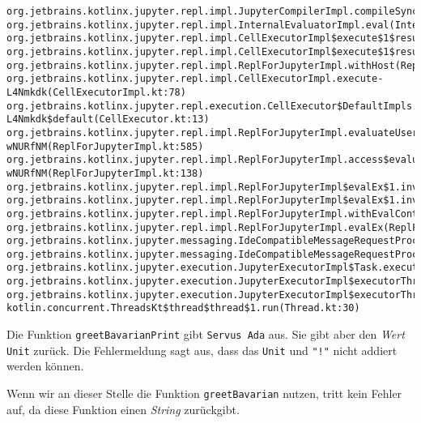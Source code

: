 \begin{verbatim}
org.jetbrains.kotlinx.jupyter.repl.impl.JupyterCompilerImpl.compileSync(JupyterCompilerImpl.kt:201)
org.jetbrains.kotlinx.jupyter.repl.impl.InternalEvaluatorImpl.eval(InternalEvaluatorImpl.kt:126)
org.jetbrains.kotlinx.jupyter.repl.impl.CellExecutorImpl$execute$1$result$1.invoke(CellExecutorImpl.kt:80)
org.jetbrains.kotlinx.jupyter.repl.impl.CellExecutorImpl$execute$1$result$1.invoke(CellExecutorImpl.kt:78)
org.jetbrains.kotlinx.jupyter.repl.impl.ReplForJupyterImpl.withHost(ReplForJupyterImpl.kt:762)
org.jetbrains.kotlinx.jupyter.repl.impl.CellExecutorImpl.execute-L4Nmkdk(CellExecutorImpl.kt:78)
org.jetbrains.kotlinx.jupyter.repl.execution.CellExecutor$DefaultImpls.execute-L4Nmkdk$default(CellExecutor.kt:13)
org.jetbrains.kotlinx.jupyter.repl.impl.ReplForJupyterImpl.evaluateUserCode-wNURfNM(ReplForJupyterImpl.kt:585)
org.jetbrains.kotlinx.jupyter.repl.impl.ReplForJupyterImpl.access$evaluateUserCode-wNURfNM(ReplForJupyterImpl.kt:138)
org.jetbrains.kotlinx.jupyter.repl.impl.ReplForJupyterImpl$evalEx$1.invoke(ReplForJupyterImpl.kt:442)
org.jetbrains.kotlinx.jupyter.repl.impl.ReplForJupyterImpl$evalEx$1.invoke(ReplForJupyterImpl.kt:439)
org.jetbrains.kotlinx.jupyter.repl.impl.ReplForJupyterImpl.withEvalContext(ReplForJupyterImpl.kt:420)
org.jetbrains.kotlinx.jupyter.repl.impl.ReplForJupyterImpl.evalEx(ReplForJupyterImpl.kt:439)
org.jetbrains.kotlinx.jupyter.messaging.IdeCompatibleMessageRequestProcessor$processExecuteRequest$1$response$1$1.invoke(IdeCompatibleMessageRequestProcessor.kt:136)
org.jetbrains.kotlinx.jupyter.messaging.IdeCompatibleMessageRequestProcessor$processExecuteRequest$1$response$1$1.invoke(IdeCompatibleMessageRequestProcessor.kt:135)
org.jetbrains.kotlinx.jupyter.execution.JupyterExecutorImpl$Task.execute(JupyterExecutorImpl.kt:42)
org.jetbrains.kotlinx.jupyter.execution.JupyterExecutorImpl$executorThread$1.invoke(JupyterExecutorImpl.kt:82)
org.jetbrains.kotlinx.jupyter.execution.JupyterExecutorImpl$executorThread$1.invoke(JupyterExecutorImpl.kt:80)
kotlin.concurrent.ThreadsKt$thread$thread$1.run(Thread.kt:30)
\end{verbatim}

\label{37b58924-7303-4e92-8ee8-86c0d6895a2d}
Die Funktion \texttt{greetBavarianPrint} gibt \texttt{Servus\ Ada} aus.
Sie gibt aber den \emph{Wert} \texttt{Unit} zurück. Die Fehlermeldung
sagt aus, dass das \texttt{Unit} und \texttt{"!"} nicht addiert werden
können.

Wenn wir an dieser Stelle die Funktion \texttt{greetBavarian} nutzen,
tritt kein Fehler auf, da diese Funktion einen \emph{String} zurückgibt.

